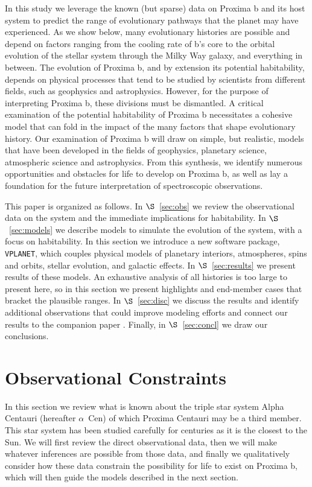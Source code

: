 \documentclass[preprint,12pt]{aastex}
\def\acen{{$\alpha$~Cen}}
\def\vplanet{\texttt{\footnotesize{VPLANET}}\xspace}
\begin{document}
In this study we leverage the known (but sparse) data on Proxima b and
its host system to predict the range of evolutionary pathways that the
planet may have experienced. As we show below, many evolutionary histories are
possible and depend on factors ranging from the cooling rate of b's
core to the orbital evolution of the stellar system through the Milky
Way galaxy, and everything in between. The evolution of Proxima b, and by
extension its potential habitability, depends on physical processes
that tend to be studied by scientists from different
fields, such as geophysics and astrophysics. However, for the purpose
of interpreting Proxima b, these divisions must be dismantled. A critical examination of the potential habitability of Proxima b necessitates
a cohesive model that can fold in the impact of the many factors that shape evolutionary
history. Our examination of Proxima b will draw on simple, but realistic, models
that have been developed in the fields of geophysics, planetary
science, atmospheric science and astrophysics. From this synthesis, we
identify numerous opportunities and obstacles for life to develop on
Proxima b, as well as lay a foundation for the future interpretation
of spectroscopic observations.

This paper is organized as follows. In $\S$~\ref{sec:obs} we review
the observational data on the system and the immediate implications
for habitability. In $\S$~\ref{sec:models} we describe models to
simulate the evolution of the system, with a focus on habitability. In
this section we introduce a new software package, \vplanet, which
couples physical models of planetary interiors, atmospheres, spins and
orbits, stellar evolution, and galactic effects. In
$\S$~\ref{sec:results} we present results of these models. An
exhaustive analysis of all histories is too large to present here, so
in this section we present highlights and end-member cases that
bracket the plausible ranges. In $\S$~\ref{sec:disc} we discuss the
results and identify additional observations that could improve
modeling efforts and connect our results to the companion paper
\citep{Meadows16}. Finally, in $\S$~\ref{sec:concl} we draw our
conclusions.

\section{Observational Constraints \label{sec:obs}}

In this section we review what is known about the triple star system
Alpha Centauri (hereafter \acen) of which Proxima Centauri may be a
third member. This star system has been studied carefully for centuries as
it is the closest to the Sun. We will first review the direct
observational data, then we will make whatever inferences are possible
from those data, and finally we qualitatively consider how these data
constrain the possibility for life to exist on Proxima b, which will
then guide the models described in the next section.
\end{document}
